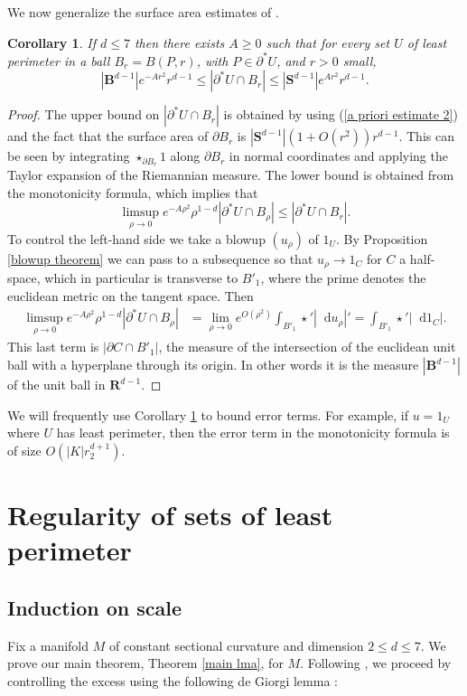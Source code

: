 \documentclass[reqno,11pt]{amsart}
\newcommand{\RR}{\mathbf{R}}
\newcommand{\Sph}{\mathbf S}
\newcommand{\Ball}{\mathbf{B}}
\newcommand*\dif{\mathop{}\!\mathrm{d}}
\newtheorem{corollary}[theorem]{Corollary}
\theoremstyle{definition}
\numberwithin{equation}{section}
\begin{document}
We now generalize the surface area estimates of \cite[Remark 5.13]{Giusti77}.

\begin{corollary}\label{doubling dimension}
If $d \leq 7$ then there exists $A \geq 0$ such that for every set $U$ of least perimeter in a ball $B_r = B(P, r)$, with $P \in \partial^* U$, and $r > 0$ small,
$$|\Ball^{d - 1}|e^{-Ar^2}r^{d - 1} \leq |\partial^*U \cap B_r| \leq |\Sph^{d - 1}|e^{Ar^2} r^{d - 1}.$$
\end{corollary}
\begin{proof}
The upper bound on $|\partial^* U \cap B_r|$ is obtained by using (\ref{a priori estimate 2}) and the fact that the surface area of $\partial B_r$ is $|\Sph^{d - 1}|(1 + O(r^2))r^{d - 1}$.
This can be seen by integrating $\star_{\partial B_r} 1$ along $\partial B_r$ in normal coordinates and applying the Taylor expansion of the Riemannian measure.
The lower bound is obtained from the monotonicity formula, which implies that
$$\limsup_{\rho \to 0} e^{-A\rho^2} \rho^{1 - d} |\partial^* U \cap B_\rho| \leq |\partial^* U \cap B_r|.$$
To control the left-hand side we take a blowup $(u_\rho)$ of $1_U$.
By Proposition \ref{blowup theorem} we can pass to a subsequence so that $u_\rho \to 1_C$ for $C$ a half-space, which in particular is transverse to $B'_1$, where the prime denotes the euclidean metric on the tangent space.
Then
\begin{align*}
\limsup_{\rho \to 0} e^{-A\rho^2} \rho^{1 - d} |\partial^* U \cap B_\rho| &= \lim_{\rho \to 0} e^{O(\rho^2)} \int_{B'_1} \star'|\dif u_\rho|' = \int_{B'_1} \star'|\dif 1_C|.
\end{align*}
This last term is $|\partial C \cap B'_1|$, the measure of the intersection of the euclidean unit ball with a hyperplane through its origin.
In other words it is the measure $|\Ball^{d - 1}|$ of the unit ball in $\RR^{d - 1}$.
\end{proof}

We will frequently use Corollary \ref{doubling dimension} to bound error terms.
For example, if $u = 1_U$ where $U$ has least perimeter, then the error term in the monotonicity formula is of size $O(|K|r_2^{d + 1})$.



\section{Regularity of sets of least perimeter}\label{Plateau section}
\subsection{Induction on scale}
Fix a manifold $M$ of constant sectional curvature and dimension $2 \leq d \leq 7$.
We prove our main theorem, Theorem \ref{main lma}, for $M$.
Following \cite{Miranda66,Giusti77,deGiorgi61}, we proceed by controlling the excess using the following de Giorgi lemma \cite[Theorem 8.1]{Giusti77}:
\end{document}
